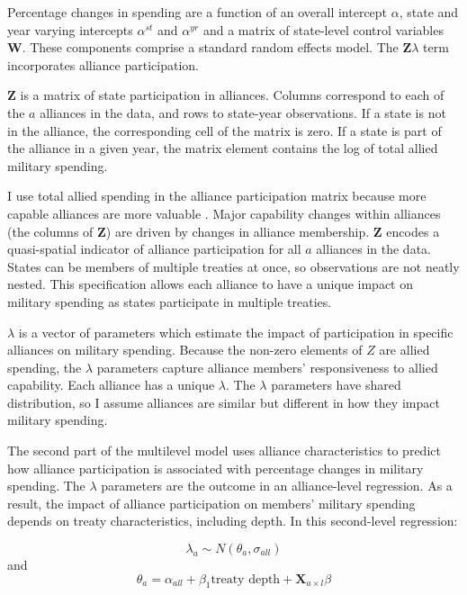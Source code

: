 \documentclass[12pt]{article}
\begin{document}
Percentage changes in spending are a function of an overall intercept $\alpha$, state and year varying intercepts $\alpha^{st}$ and $\alpha^{yr}$ and a matrix of state-level control variables $\textbf{W}$.
These components comprise a standard random effects model. 
The $\textbf{Z} \lambda$ term incorporates alliance participation.


$\textbf{Z}$ is a matrix of state participation in alliances. 
Columns correspond to each of the $a$ alliances in the data, and rows to state-year observations. 
If a state is not in the alliance, the corresponding cell of the matrix is zero.
If a state is part of the alliance in a given year, the matrix element contains the log of total allied military spending.


I use total allied spending in the alliance participation matrix because more capable alliances are more valuable \citep{Johnsonetal2015}.
Major capability changes within alliances (the columns of \textbf{Z}) are driven by changes in alliance membership. 
$\textbf{Z}$ encodes a quasi-spatial indicator of alliance participation for all $a$ alliances in the data. 
States can be members of multiple treaties at once, so observations are not neatly nested. 
This specification allows each alliance to have a unique impact on military spending as states participate in multiple treaties. 


$\lambda$ is a vector of parameters which estimate the impact of participation in specific alliances on military spending. 
Because the non-zero elements of $Z$ are allied spending, the $\lambda$ parameters capture alliance members' responsiveness to allied capability. 
Each alliance has a unique $\lambda$. 
The $\lambda$ parameters have shared distribution, so I assume alliances are similar but different in how they impact military spending. 


The second part of the multilevel model uses alliance characteristics to predict how alliance participation is associated with percentage changes in military spending. 
The $\lambda$ parameters are the outcome in an alliance-level regression.
As a result, the impact of alliance participation on members' military spending depends on treaty characteristics, including depth. 
In this second-level regression: 


\begin{equation}
\lambda_{a} \sim N(\theta_{a}, \sigma_{all})
\end{equation} 
and 
\begin{equation}
\theta_{a} = \alpha_{all} + \beta_1 \mbox{treaty depth} + \textbf{X}_{a \times l} \beta
\end{equation}
\end{document}
